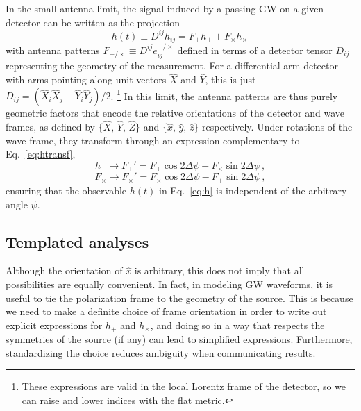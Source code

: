 \documentclass[aps,prd,twocolumn,superscriptaddress,preprintnumbers,floatfix,nofootinbib]{revtex4-2}
\newcommand{\beq}{\begin{equation}}
\newcommand{\eeq}{\end{equation}}
\newcommand*{\eq}[1]{Eq.~\eqref{eq:#1}}
\begin{document}
In the small-antenna limit, the signal induced by a passing GW on a given detector can be written as the projection
\beq \label{eq:h}
h(t) \equiv D^{ij} h_{ij} = F_+ h_+ + F_\times h_\times\, 
\eeq
with antenna patterns $F_{+/\times} \equiv D^{ij} e^{+/\times}_{ij}$ defined in terms of a detector tensor $D_{ij}$ representing the geometry of the measurement.
For a differential-arm detector with arms pointing along unit vectors $\hat{X}$ and $\hat{Y}$, this is just $D_{ij} = (\hat{X}_i \hat{X}_j - \hat{Y}_i \hat{Y}_j)/2$.%
\footnote{These expressions are valid in the local Lorentz frame of the detector, so we can raise and lower indices with the flat metric.}
In this limit, the antenna patterns are thus purely geometric factors that encode the relative orientations of the detector and wave frames, as defined by $\{\hat{X},\, \hat{Y},\, \hat{Z}\}$ and $\{\hat{x},\, \hat{y},\, \hat{z}\}$ respectively.
Under rotations of the wave frame, they transform through an expression complementary to \eq{htransf},
\beq \label{eq:Ftransf}
h_+ \rightarrow F_+' = F_+ \cos 2\Delta \psi + F_\times \sin 2\Delta\psi \, ,
\eeq
\beq
F_\times \rightarrow F_\times' = F_\times \cos 2\Delta \psi - F_+ \sin 2\Delta\psi \, ,
\eeq
ensuring that the observable $h(t)$ in \eq{h} is independent of the arbitrary angle $\psi$.

\subsection{Templated analyses}

Although the orientation of $\hat{x}$ is arbitrary, this does not imply that all possibilities are equally convenient. 
In fact, in modeling GW waveforms, it is useful to tie the polarization frame to the geometry of the source.
This is because we need to make a definite choice of frame orientation in order to write out explicit expressions for $h_+$ and $h_\times$, and doing so in a way that respects the symmetries of the source (if any) can lead to simplified expressions.
Furthermore, standardizing the choice reduces ambiguity when communicating results.
\end{document}
